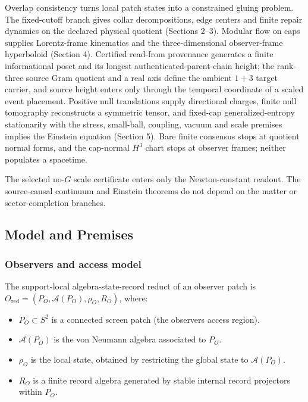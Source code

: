 Overlap consistency turns local patch states into a constrained gluing problem. The
fixed-cutoff branch gives collar decompositions, edge centers and finite repair dynamics on the
declared physical quotient (Sections 2--3). Modular flow on caps supplies Lorentz-frame
kinematics and the three-dimensional observer-frame hyperboloid (Section 4). Certified
read-from provenance generates a finite informational poset and its longest
authenticated-parent-chain height; the rank-three source Gram quotient and a real axis define
the ambient \(1+3\) target carrier, and source height enters only through the temporal
coordinate of a scaled event placement. Positive null translations supply directional charges,
finite null tomography reconstructs a symmetric tensor, and fixed-cap generalized-entropy
stationarity with the stress, small-ball, coupling, vacuum and scale premises implies the
Einstein equation (Section 5). Bare finite consensus stops at quotient normal forms, and the
cap-normal \(H^3\) chart stops at observer frames; neither populates a spacetime.

The selected no-\(G\) scale certificate enters only the Newton-constant readout. The
source-causal continuum and Einstein theorems do not depend on the matter or sector-completion
branches.

\subsection{Model and Premises}\label{1-model-and-axioms}

\subsubsection{Observers and access model}\label{11-observers-and-access-model}

The support-local algebra-state-record reduct of an observer patch is
\(O_{\mathrm{red}}=(P_O, \mathcal{A}(P_O), \rho_O, R_O)\), where:

\begin{itemize}
\tightlist
\item
  \(P_O \subset S^2\) is a connected screen patch (the observer\textquotesingle s access region).
\item
  \(\mathcal{A}(P_O)\) is the von Neumann algebra associated to \(P_O\).
\item
  \(\rho_O\) is the local state, obtained by restricting the global state to \(\mathcal{A}(P_O)\).
\item
  \(R_O\) is a finite record algebra generated by stable internal record projectors within \(P_O\).
\end{itemize}

